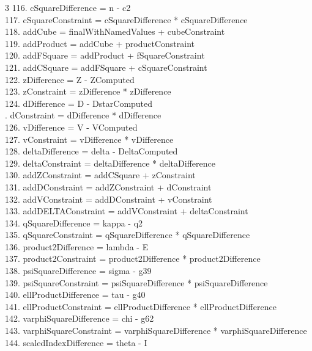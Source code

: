 \documentclass[10pt]{article}
\begin{document}
\begin{multicols}{3}
116. cSquareDifference = n - c2\\
117. cSquareConstraint = cSquareDifference * cSquareDifference\\
118. addCube = finalWithNamedValues + cubeConstraint\\
119. addProduct = addCube + productConstraint\\
120. addFSquare = addProduct + fSquareConstraint\\
121. addCSquare = addFSquare + cSquareConstraint\\
122. zDifference = Z - ZComputed\\
123. zConstraint = zDifference * zDifference\\
124. dDifference = D - DstarComputed\\
. dConstraint = dDifference * dDifference\\
126. vDifference = V - VComputed\\
127. vConstraint = vDifference * vDifference\\
128. deltaDifference = delta - DeltaComputed\\
129. deltaConstraint = deltaDifference * deltaDifference\\
130. addZConstraint = addCSquare + zConstraint\\
131. addDConstraint = addZConstraint + dConstraint\\
132. addVConstraint = addDConstraint + vConstraint\\
133. addDELTAConstraint = addVConstraint + deltaConstraint\\
134. qSquareDifference = kappa - q2\\
135. qSquareConstraint = qSquareDifference * qSquareDifference\\
136. product2Difference = lambda - E\\
137. product2Constraint = product2Difference * product2Difference\\
138. psiSquareDifference = sigma - g39\\
139. psiSquareConstraint = psiSquareDifference * psiSquareDifference\\
140. ellProductDifference = tau - g40\\
141. ellProductConstraint = ellProductDifference * ellProductDifference\\
142. varphiSquareDifference = chi - g62\\
143. varphiSquareConstraint = varphiSquareDifference * varphiSquareDifference\\
144. scaledIndexDifference = theta - I\\

\end{multicols}
\end{document}
